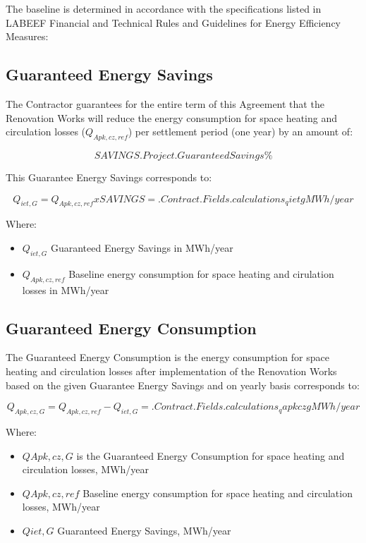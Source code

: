 The baseline is determined in accordance with the specifications listed in
LABEEF Financial and Technical Rules and Guidelines for Energy Efficiency
Measures:


\begin{center}
\end{center}

\subsection{Guaranteed Energy Savings}

The Contractor guarantees for the entire term of this Agreement that the
Renovation Works will reduce the energy consumption for space heating and
circulation losses ($Q_{Apk,cz,ref}$) per settlement period (one year) by an amount
of:

\[SAVINGS \iffalse input project.savings value="{{.Project.GuaranteedSavings}}" type="number" \fi {{.Project.GuaranteedSavings}} \%\]

This Guarantee Energy Savings corresponds to:

\[Q_{iet,G} = Q_{Apk, cz, ref} x SAVINGS = {{.Contract.Fields.calculations_qietg}} MWh/year\]

Where:

\begin{itemize}
	\item $Q_{iet,G}$	Guaranteed Energy Savings in MWh/year
	\item $Q_{Apk,cz,ref}$	Baseline energy consumption for space heating and cirulation losses in MWh/year
\end{itemize}

\subsection{Guaranteed Energy Consumption}
The Guaranteed Energy Consumption is the energy consumption for space heating
and circulation losses after implementation of the Renovation Works based on
the given Guarantee Energy Savings and on yearly basis corresponds to:

\[Q_{Apk,cz,G} = Q_{Apk,cz,ref} - Q_{iet,G} = {{.Contract.Fields.calculations_qapkczg}} MWh/year\]

Where:

\begin{itemize}
	\item $QApk,cz,G$	is the Guaranteed Energy Consumption for space heating and circulation losses, MWh/year
	\item $QApk,cz,ref$	Baseline energy consumption for space heating and circulation losses, MWh/year
	\item $Qiet,G$	Guaranteed Energy Savings, MWh/year
\end{itemize}
